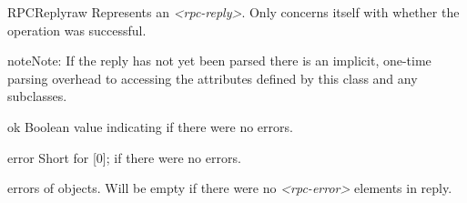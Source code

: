 \documentclass[a4paper,10pt,english]{manual}
\begin{document}
\hypertarget{ncclient.operations.rpc.RPCReply}{}\begin{classdesc}{RPCReply}{raw}
Represents an \emph{\textless{}rpc-reply\textgreater{}}. Only concerns itself with whether the
operation was successful.

\begin{notice}{note}{Note:}
If the reply has not yet been parsed there is an implicit, one-time
parsing overhead to accessing the attributes defined by this class and
any subclasses.
\end{notice}

\hypertarget{ncclient.operations.rpc.RPCReply.ok}{}\begin{memberdesc}{ok}
Boolean value indicating if there were no errors.
\end{memberdesc}

\hypertarget{ncclient.operations.rpc.RPCReply.error}{}\begin{memberdesc}{error}
Short for \hyperlink{ncclient.operations.rpc.RPCReply.errors}{} {[}0{]}; \href{http://docs.python.org/library/constants.html\#None}{} if there were no errors.
\end{memberdesc}

\hypertarget{ncclient.operations.rpc.RPCReply.errors}{}\begin{memberdesc}{errors}
\href{http://docs.python.org/library/functions.html\#list}{} of \hyperlink{ncclient.operations.rpc.RPCError}{} objects. Will be empty if there were no
\emph{\textless{}rpc-error\textgreater{}} elements in reply.
\end{memberdesc}
\end{classdesc}
\end{document}
